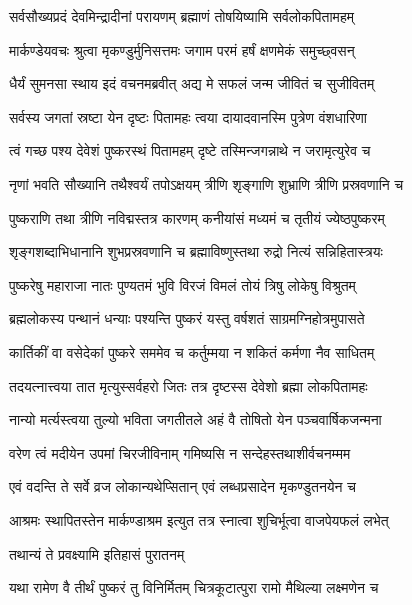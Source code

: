 \twolineshloka
{सर्वसौख्यप्रदं देवमिन्द्रादीनां परायणम्}
{ब्रह्माणं तोषयिष्यामि सर्वलोकपितामहम्} %

\twolineshloka
{मार्कण्डेयवचः श्रुत्वा मृकण्डुर्मुनिसत्तमः}
{जगाम परमं हर्षं क्षणमेकं समुच्छ्वसन्} %

\twolineshloka
{धैर्यं सुमनसा स्थाय इदं वचनमब्रवीत्}
{अद्य मे सफलं जन्म जीवितं च सुजीवितम्} %

\twolineshloka
{सर्वस्य जगतां स्रष्टा येन दृष्टः पितामहः}
{त्वया दायादवानस्मि पुत्रेण वंशधारिणा} %

\twolineshloka
{त्वं गच्छ पश्य देवेशं पुष्करस्थं पितामहम्}
{दृष्टे तस्मिन्जगन्नाथे न जरामृत्युरेव च} %

\twolineshloka
{नृणां भवति सौख्यानि तथैश्वर्यं तपोऽक्षयम्}
{त्रीणि शृङ्गाणि शुभ्राणि त्रीणि प्रस्रवणानि च} %

\twolineshloka
{पुष्कराणि तथा त्रीणि नविद्मस्तत्र कारणम्}
{कनीयांसं मध्यमं च तृतीयं ज्येष्ठपुष्करम्} %

\twolineshloka
{शृङ्गशब्दाभिधानानि शुभप्रस्रवणानि च}
{ब्रह्माविष्णुस्तथा रुद्रो नित्यं सन्निहितास्त्रयः} %

\twolineshloka
{पुष्करेषु महाराजा नातः पुण्यतमं भुवि}
{विरजं विमलं तोयं त्रिषु लोकेषु विश्रुतम्} %

\twolineshloka
{ब्रह्मलोकस्य पन्थानं धन्याः पश्यन्ति पुष्करं}
{यस्तु वर्षशतं साग्रमग्निहोत्रमुपासते} %

\twolineshloka
{कार्तिकीं वा वसेदेकां पुष्करे सममेव च}
{कर्तुम्मया न शकितं कर्मणा नैव साधितम्} %

\twolineshloka
{तदयत्नात्त्वया तात मृत्युस्सर्वहरो जितः}
{तत्र दृष्टस्स देवेशो ब्रह्मा लोकपितामहः} %

\twolineshloka
{नान्यो मर्त्यस्त्वया तुल्यो भविता जगतीतले}
{अहं वै तोषितो येन पञ्चवार्षिकजन्मना} %

\twolineshloka
{वरेण त्वं मदीयेन उपमां चिरजीविनाम्}
{गमिष्यसि न सन्देहस्तथाशीर्वचनम्मम} %

\twolineshloka
{एवं वदन्ति ते सर्वे व्रज लोकान्यथेप्सितान्}
{एवं लब्धप्रसादेन मृकण्डुतनयेन च} %

\twolineshloka
{आश्रमः स्थापितस्तेन मार्कण्डाश्रम इत्युत}
{तत्र स्नात्वा शुचिर्भूत्वा वाजपेयफलं लभेत्} %




\onelineshloka
{तथान्यं ते प्रवक्ष्यामि इतिहासं पुरातनम्} %

\twolineshloka
{यथा रामेण वै तीर्थं पुष्करं तु विनिर्मितम्}
{चित्रकूटात्पुरा रामो मैथिल्या लक्ष्मणेन च} %

